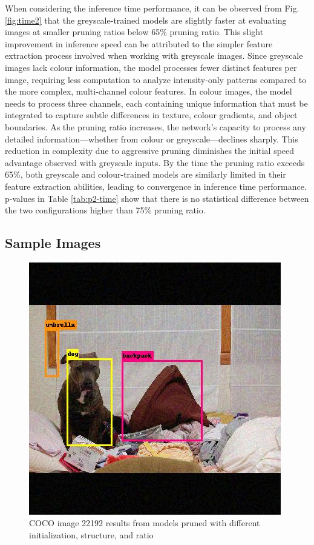 \documentclass[journal,onecolumn,12pt]{IEEEtran}
\begin{document}
When considering the inference time performance, it can be observed from Fig. \ref{fig:time2} that the greyscale-trained models are slightly faster at evaluating images at smaller pruning ratios below 65\% pruning ratio. This slight improvement in inference speed can be attributed to the simpler feature extraction process involved when working with greyscale images. Since greyscale images lack colour information, the model processes fewer distinct features per image, requiring less computation to analyze intensity-only patterns compared to the more complex, multi-channel colour features. In colour images, the model needs to process three channels, each containing unique information that must be integrated to capture subtle differences in texture, colour gradients, and object boundaries. As the pruning ratio increases, the network's capacity to process any detailed information—whether from colour or greyscale—declines sharply. This reduction in complexity due to aggressive pruning diminishes the initial speed advantage observed with greyscale inputs. By the time the pruning ratio exceeds 65\%, both greyscale and colour-trained models are similarly limited in their feature extraction abilities, leading to convergence in inference time performance. p-values in Table \ref{tab:p2-time} show that there is no statistical difference between the two configurations higher than 75\% pruning ratio.

\subsection{Sample Images}

\begin{figure}
    \centering
    \captionsetup{justification=centering}
    \includegraphics[width=0.6\linewidth]{figures/attack_after_22192.jpg}
    \caption{COCO image 22192 results from models pruned with different initialization, structure, and ratio}
    \label{fig:temp}
\end{figure}
\end{document}

